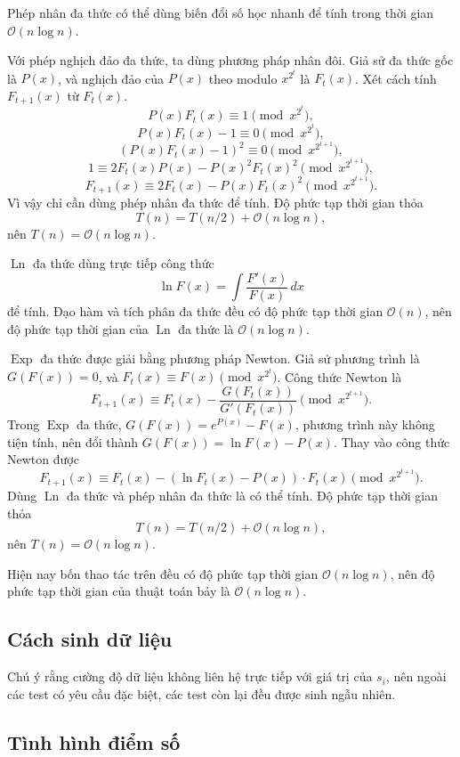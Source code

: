 \documentclass[11pt]{article}
\newcommand{\Oh}{\mathcal{O}}
\begin{document}
Phép nhân đa thức có thể dùng biến đổi số học nhanh để tính trong thời gian
\(\Oh(n\log n)\).

Với phép nghịch đảo đa thức, ta dùng phương pháp nhân đôi. Giả sử đa thức gốc
là \(P(x)\), và nghịch đảo của \(P(x)\) theo modulo \(x^{2^t}\) là \(F_t(x)\).
Xét cách tính \(F_{t+1}(x)\) từ \(F_t(x)\).
\[
  P(x)F_t(x)\equiv 1\pmod{x^{2^t}},
\]
\[
  P(x)F_t(x)-1\equiv 0\pmod{x^{2^t}},
\]
\[
  (P(x)F_t(x)-1)^2\equiv 0\pmod{x^{2^{t+1}}},
\]
\[
  1\equiv 2F_t(x)P(x)-P(x)^2F_t(x)^2\pmod{x^{2^{t+1}}},
\]
\[
  F_{t+1}(x)\equiv
  2F_t(x)-P(x)F_t(x)^2\pmod{x^{2^{t+1}}}.
\]
Vì vậy chỉ cần dùng phép nhân đa thức để tính. Độ phức tạp thời gian thỏa
\[
  T(n)=T(n/2)+\Oh(n\log n),
\]
nên \(T(n)=\Oh(n\log n)\).

\(\operatorname{Ln}\) đa thức dùng trực tiếp công thức
\[
  \ln F(x)=\int\frac{F'(x)}{F(x)}\,dx
\]
để tính. Đạo hàm và tích phân đa thức đều có độ phức tạp thời gian \(\Oh(n)\),
nên độ phức tạp thời gian của \(\operatorname{Ln}\) đa thức là
\(\Oh(n\log n)\).

\(\operatorname{Exp}\) đa thức được giải bằng phương pháp Newton. Giả sử
phương trình là \(G(F(x))=0\), và \(F_t(x)\equiv F(x)\pmod{x^{2^t}}\). Công
thức Newton là
\[
  F_{t+1}(x)\equiv
  F_t(x)-\frac{G(F_t(x))}{G'(F_t(x))}
  \pmod{x^{2^{t+1}}}.
\]
Trong \(\operatorname{Exp}\) đa thức, \(G(F(x))=e^{P(x)}-F(x)\), phương trình
này không tiện tính, nên đổi thành \(G(F(x))=\ln F(x)-P(x)\). Thay vào công
thức Newton được
\[
  F_{t+1}(x)\equiv
  F_t(x)-(\ln F_t(x)-P(x))\cdot F_t(x)
  \pmod{x^{2^{t+1}}}.
\]
Dùng \(\operatorname{Ln}\) đa thức và phép nhân đa thức là có thể tính. Độ
phức tạp thời gian thỏa
\[
  T(n)=T(n/2)+\Oh(n\log n),
\]
nên \(T(n)=\Oh(n\log n)\).

Hiện nay bốn thao tác trên đều có độ phức tạp thời gian \(\Oh(n\log n)\), nên
độ phức tạp thời gian của thuật toán bảy là \(\Oh(n\log n)\).

\subsection{Cách sinh dữ liệu}

Chú ý rằng cường độ dữ liệu không liên hệ trực tiếp với giá trị của \(s_i\),
nên ngoài các test có yêu cầu đặc biệt, các test còn lại đều được sinh ngẫu
nhiên.

\subsection{Tình hình điểm số}
\end{document}

